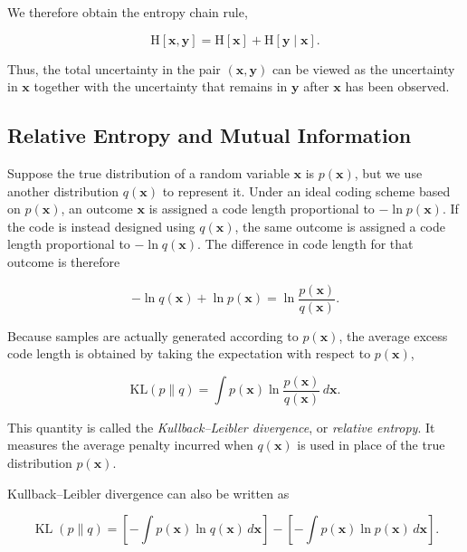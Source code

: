 \documentclass[10pt,twocolumn]{memoir}
\begin{document}
We therefore obtain the entropy chain rule,

\begin{equation}
    \mathrm{H}[\mathbf{x},\mathbf{y}] = \mathrm{H}[\mathbf{x}] + \mathrm{H}[\mathbf{y}\mid\mathbf{x}].
\label{eq:c1_entropy_chain_rule}
\end{equation}

Thus, the total uncertainty in the pair $(\mathbf{x},\mathbf{y})$ can be viewed as the uncertainty in $\mathbf{x}$ together with the uncertainty that remains in $\mathbf{y}$ after $\mathbf{x}$ has been observed.


\subsection{Relative Entropy and Mutual Information}

Suppose the true distribution of a random variable $\mathbf{x}$ is $p(\mathbf{x})$, but we use another distribution $q(\mathbf{x})$ to represent it. Under an ideal coding scheme based on $p(\mathbf{x})$, an outcome $\mathbf{x}$ is assigned a code length proportional to $-\ln p(\mathbf{x})$. If the code is instead designed using $q(\mathbf{x})$, the same outcome is assigned a code length proportional to $-\ln q(\mathbf{x})$. The difference in code length for that outcome is therefore

\begin{equation}
    -\ln q(\mathbf{x})+\ln p(\mathbf{x}) = \ln\frac{p(\mathbf{x})}{q(\mathbf{x})}.
\end{equation}

Because samples are actually generated according to $p(\mathbf{x})$, the average excess code length is obtained by taking the expectation with respect to $p(\mathbf{x})$,

\begin{equation}
    \mathrm{KL}(p\|q) = \int p(\mathbf{x})\ln\frac{p(\mathbf{x})}{q(\mathbf{x})}\,d\mathbf{x}.
\end{equation}

This quantity is called the \textit{Kullback--Leibler divergence}, or \textit{relative entropy}. It measures the average penalty incurred when $q(\mathbf{x})$ is used in place of the true distribution $p(\mathbf{x})$.

Kullback--Leibler divergence can also be written as

\begin{equation}
    \operatorname{KL}(p\|q) = \left[-\int p(\mathbf{x})\ln q(\mathbf{x})\,d\mathbf{x}\right]- \left[-\int p(\mathbf{x})\ln p(\mathbf{x})\,d\mathbf{x}\right].
\end{equation}
\end{document}

